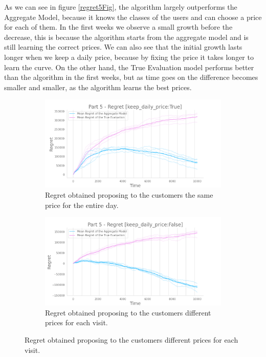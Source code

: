 As we can see in figure \ref{regret5Fig}, the algorithm largely outperforms the Aggregate Model, because it knows the classes of the users and can choose a price for each of them.
In the first weeks we observe a small growth before the decrease, this is because the algorithm starts from the aggregate model and is still learning the correct prices.
We can also see that the initial growth lasts longer when we keep a daily price, because by fixing the price it takes longer to learn the curve.
On the other hand, the True Evaluation model performs better than the algorithm in the first weeks, but as time goes on the difference becomes smaller and smaller, as the algorithm learns the best prices.

\begin{figure}[!htb]
	\centering

	\begin{subfigure}[!H]{0.8\textwidth}
		\centering
		\includegraphics[width=\textwidth]{images/part5_keep-daily-priceTrue.png}
		\caption{Regret obtained proposing to the customers the same price for the entire day.}
	\end{subfigure}

	\begin{subfigure}[!H]{0.8\textwidth}
		\centering
		\includegraphics[width=\textwidth]{images/part5_keep-daily-priceFalse.png}
		\caption{Regret obtained proposing to the customers different prices for each visit.}
	\end{subfigure}


\end{figure}

